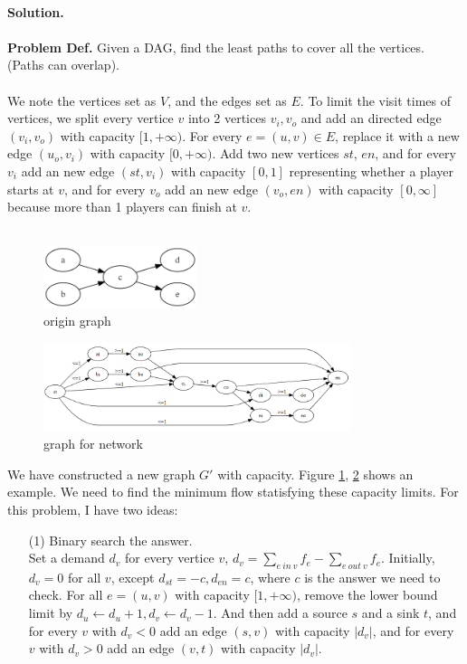 \documentclass{article}
\begin{document}
\begin{enumerate}
~\\
\textbf{Solution.}\\~\\
\textbf{Problem Def.} Given a DAG, find the least paths to cover all the vertices. (Paths can overlap).\\~\\
We note the vertices set as $V$, and the edges set as $E$. To limit the visit times of vertices, we split every vertice $v$ into 2 vertices $v_i, v_o$ and add an directed edge $(v_i, v_o)$ with capacity $[1,+\infty)$. For every $e=(u,v)\in E$, replace it with a new edge $(u_o, v_i)$ with capacity $[0,+\infty)$. Add two new vertices $st$, $en$, and for every $v_i$ add an new edge $(st, v_i)$ with capacity $[0,1]$ representing whether a player starts at $v$, and for every $v_o$ add an new edge $(v_o, en)$ with capacity $[0, \infty]$ because more than 1 players can finish at $v$. \\
~\\
\begin{figure}[htb]
    \centering
    \includegraphics[width=0.4\textwidth]{1.png}
    \caption{origin graph}
    \label{fig1}
\end{figure}
\begin{figure}[htb]
    \centering
    \includegraphics[width=0.8\textwidth]{2.png}
    \caption{graph for network}
    \label{fig2}
\end{figure}
\noindent We have constructed a new graph $G'$ with capacity. Figure \ref{fig1}, \ref{fig2} shows an example. We need to find the minimum flow statisfying these capacity limits. For this problem, 
I have two ideas:  
\begin{itemize}
\item [(1)] Binary search the answer.\\
Set a demand $d_v$ for every vertice $v$, $d_v = \sum_{e\ in\ v} f_e - \sum_{e\ out\ v} f_e$. Initially, $d_v = 0$ for all $v$, except $d_{st} = -c, d_{en} = c$, where $c$ is the answer we need to check. For all $e=(u,v)$ with capacity $[1,+\infty)$, remove the lower bound limit by $d_u\leftarrow d_u + 1, d_v\leftarrow d_v - 1$. And then add a source $s$ and a sink $t$, and for every $v$ with $d_v<0$ add an edge $(s, v)$ with capacity $|d_v|$, and for every $v$ with $d_v>0$ add an edge $(v, t)$ with capacity $|d_v|$. 

\end{itemize}
\end{enumerate}
\end{document}
